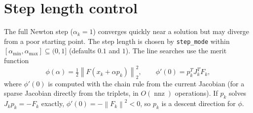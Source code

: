 \documentclass[11pt]{article}
\newcommand{\norm}[1]{\left\lVert #1 \right\rVert}
\newcommand{\code}[1]{\texttt{#1}}
\DeclareMathOperator{\nnz}{nnz}
\begin{document}
\section{Step length control}
\label{sec:linesearch}

The full Newton step ($\alpha_k = 1$) converges quickly near a solution but may diverge from a poor
starting point. The step length is chosen by \code{step\_mode} within
$[\alpha_{\min}, \alpha_{\max}] \subseteq (0,1]$ (defaults $0.1$ and $1$). The line searches use the merit
function
\begin{equation}
  \phi(\alpha) = \tfrac12 \norm{F(x_k + \alpha p_k)}_2^2 ,
  \qquad
  \phi'(0) = p_k^T J_k^T F_k ,
  \label{eq:merit}
\end{equation}
where $\phi'(0)$ is computed with the chain rule from the current Jacobian (for a sparse Jacobian
directly from the triplets, in $O(\nnz)$ operations). If $p_k$ solves $J_k p_k = -F_k$ exactly,
$\phi'(0) = -\norm{F_k}^2 < 0$, so $p_k$ is a descent direction for $\phi$.
\end{document}
